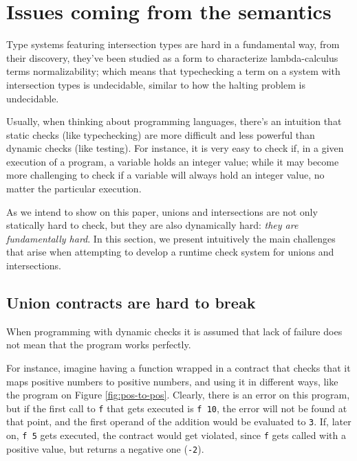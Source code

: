 \documentclass[sigplan,10pt,review,anonymous]{acmart}
\newcommand{\info}[2][1=]{}
\newcommand{\nickel}[1]{\lstinline[language=nickel]{#1}}
\begin{document}
\newpage

\section{Issues coming from the semantics}
\info{What goes wrong or difficult when trying to implement union and
  intersection literally}

Type systems featuring intersection types are hard in a fundamental way,
from their discovery, they've been studied as a form to characterize
lambda-calculus terms normalizability; which means that typechecking a
term on a system with intersection types is undecidable,
similar to how the halting problem is undecidable.

Usually, when thinking about programming languages, there's an intuition
that static checks (like typechecking) are more difficult and less powerful
than dynamic checks (like testing).
For instance, it is very easy to check if,
in a given execution of a program, a variable holds an integer value; while it
may become more challenging to check if a variable will always hold an integer value,
no matter the particular execution.

As we intend to show on this paper, unions and intersections are not only
statically hard to check, but they are also dynamically hard:
\emph{they are fundamentally hard}.
In this section, we present intuitively the main challenges that arise
when attempting to develop a runtime check system for unions and intersections.

\subsection*{Union contracts are hard to break}

When programming with dynamic checks it is assumed that lack of
failure does not mean that the program works perfectly.

For instance, imagine having a function wrapped in a contract
that checks that it maps positive numbers to positive numbers,
and using it in different ways,
like the program on Figure \ref{fig:pos-to-pos}.
Clearly, there is an error on this program, but if the first call
to \nickel{f} that gets executed is \nickel{f 10}, the error will not
be found at that point, and the first operand of the addition would be
evaluated to \nickel{3}.
If, later on, \nickel{f 5} gets executed, the contract would get violated,
since \nickel{f} gets called with a positive value, but returns a negative
one (\nickel{-2}).
\end{document}
